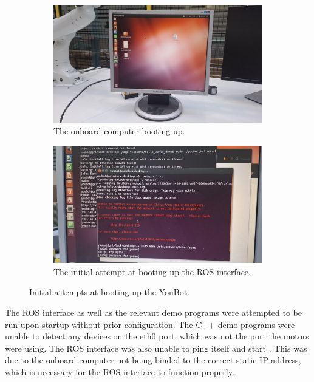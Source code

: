 \documentclass[a4paper, 12pt]{article}
\newcommand{\code}[1]{\texttt{\detokenize{#1}}}
\begin{document}
    \begin{figure}[H]
        \centering
        \begin{subfigure}[t]{0.49\linewidth}
            \centering
            \includegraphics[width=\linewidth]{images/sec4/initial_computer_bootup.jpg}
            \caption{The onboard computer booting up.}
        \end{subfigure}
        \hfill
        \begin{subfigure}[t]{0.49\linewidth}
            \centering
            \includegraphics[width=\linewidth]{images/sec4/initial_ros_bootup.jpg}
            \caption{The initial attempt at booting up the ROS interface.}
        \end{subfigure}
        \caption{Initial attempts at booting up the YouBot.}
    \end{figure}

    The ROS interface as well as the relevant demo programs were attempted to be run upon startup without prior configuration. The C++ demo programs were unable to detect any devices on the eth0 port, which was not the port the motors were using. The ROS interface was also unable to ping itself and start \code{roscore}. This was due to the onboard computer not being binded to the correct static IP address, which is necessary for the ROS interface to function properly.
\end{document}
